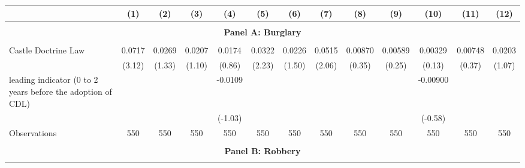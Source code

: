 \begin{tabular}{l*{12}{c}} \hline\hline
                    &\multicolumn{1}{c}{(1)}         &\multicolumn{1}{c}{(2)}         &\multicolumn{1}{c}{(3)}         &\multicolumn{1}{c}{(4)}         &\multicolumn{1}{c}{(5)}         &\multicolumn{1}{c}{(6)}         &\multicolumn{1}{c}{(7)}         &\multicolumn{1}{c}{(8)}         &\multicolumn{1}{c}{(9)}         &\multicolumn{1}{c}{(10)}         &\multicolumn{1}{c}{(11)}         &\multicolumn{1}{c}{(12)}         \\
\hline \\ \multicolumn{13}{c}{\textbf{Panel A: Burglary}} \\\\[-1ex]
Castle Doctrine Law &      0.0717\sym{**} &      0.0269         &      0.0207         &      0.0174         &      0.0322\sym{*}  &      0.0226         &      0.0515\sym{*}  &     0.00870         &     0.00589         &     0.00329         &     0.00748         &      0.0203         \\
                    &      (3.12)         &      (1.33)         &      (1.10)         &      (0.86)         &      (2.23)         &      (1.50)         &      (2.06)         &      (0.35)         &      (0.25)         &      (0.13)         &      (0.37)         &      (1.07)         \\
[1em]
leading indicator (0 to 2 years before the adoption of CDL)&                     &                     &                     &     -0.0109         &                     &                     &                     &                     &                     &    -0.00900         &                     &                     \\
                    &                     &                     &                     &     (-1.03)         &                     &                     &                     &                     &                     &     (-0.58)         &                     &                     \\
\hline
Observations        &         550         &         550         &         550         &         550         &         550         &         550         &         550         &         550         &         550         &         550         &         550         &         550         \\
\hline \\ \multicolumn{13}{c}{\textbf{Panel B: Robbery}} \\\\[-1ex]

\end{tabular}
